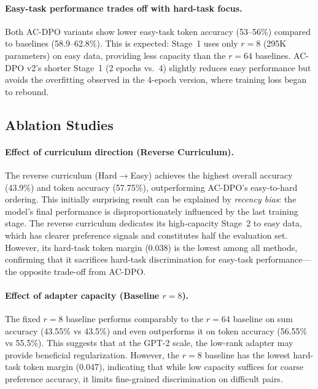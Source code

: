 \documentclass{article}
\begin{document}
\paragraph{Easy-task performance trades off with hard-task focus.}
Both AC-DPO variants show lower easy-task token accuracy (53--56\%) compared to baselines (58.9--62.8\%). This is expected: Stage~1 uses only $r{=}8$ (295K parameters) on easy data, providing less capacity than the $r{=}64$ baselines. AC-DPO v2's shorter Stage~1 (2 epochs vs.\ 4) slightly reduces easy performance but avoids the overfitting observed in the 4-epoch version, where training loss began to rebound.

\subsection{Ablation Studies}

\paragraph{Effect of curriculum direction (Reverse Curriculum).}
The reverse curriculum (Hard$\rightarrow$Easy) achieves the highest overall accuracy (43.9\%) and token accuracy (57.75\%), outperforming AC-DPO's easy-to-hard ordering. This initially surprising result can be explained by \emph{recency bias}: the model's final performance is disproportionately influenced by the last training stage. The reverse curriculum dedicates its high-capacity Stage~2 to easy data, which has clearer preference signals and constitutes half the evaluation set. However, its hard-task token margin (0.038) is the lowest among all methods, confirming that it sacrifices hard-task discrimination for easy-task performance---the opposite trade-off from AC-DPO.

\paragraph{Effect of adapter capacity (Baseline $r{=}8$).}
The fixed $r{=}8$ baseline performs comparably to the $r{=}64$ baseline on sum accuracy (43.55\% vs 43.5\%) and even outperforms it on token accuracy (56.55\% vs 55.5\%). This suggests that at the GPT-2 scale, the low-rank adapter may provide beneficial regularization. However, the $r{=}8$ baseline has the lowest hard-task token margin (0.047), indicating that while low capacity suffices for coarse preference accuracy, it limits fine-grained discrimination on difficult pairs.
\end{document}
